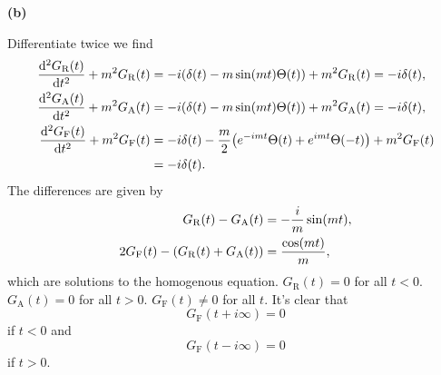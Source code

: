\documentclass{article}
\makeatletter
\newcommand*{\shifttext}[1]{%
  \settowidth{\@tempdima}{#1}%
  \hspace{-\@tempdima}#1%
}
\newcommand{\plabel}[1]{%
\shifttext{\textbf{#1}\quad}%
}
\makeatother
\begin{document}
\plabel{(b)}
Differentiate twice we find
\begin{align*}
    \dv[2]{G_{\mathrm{R}}(t)}{t} + m^2 G_{\mathrm{R}}(t) &= -i(\delta(t) - m \sin(mt)\Theta(t)) + m^2 G_{\mathrm{R}}(t) = -i\delta(t), \\
    \dv[2]{G_{\mathrm{A}}(t)}{t} + m^2 G_{\mathrm{A}}(t) &= -i(\delta(t) - m \sin(mt)\Theta(t)) + m^2 G_{\mathrm{A}}(t) = -i\delta(t), \\
    \dv[2]{G_{\mathrm{F}}(t)}{t} + m^2 G_{\mathrm{F}}(t) &= -i\delta(t) - \frac{m}{2}\qty(e^{-imt}\Theta(t) + e^{imt}\Theta(-t)) + m^2 G_{\mathrm{F}}(t) \\ &= -i\delta(t).
\end{align*}
The differences are given by
\begin{align*}
    G_{\mathrm{R}}(t) - G_{\mathrm{A}}(t) &= -\frac{i}{m}\sin(mt), \\
    2G_{\mathrm{F}}(t) - \qty(G_{\mathrm{R}}(t) + G_{\mathrm{A}}(t)) &= \frac{\cos(mt)}{m},
\end{align*}
which are solutions to the homogenous equation.
$G_{\mathrm{R}}(t) = 0$ for all $t<0$.
$G_{\mathrm{A}}(t) = 0$ for all $t>0$.
$G_{\mathrm{F}}(t) \neq 0$ for all $t$.
It's clear that
\[ G_{\mathrm{F}}(t + i\infty) = 0 \]
if $t < 0$ and
\[ G_{\mathrm{F}}(t - i\infty) = 0 \]
if $t > 0$.
\end{document}
